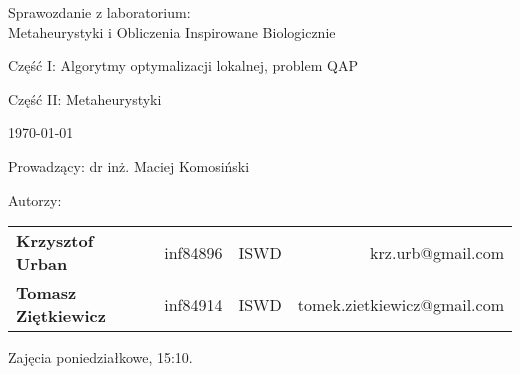 \thispagestyle{empty} %

\begin{center}
{\large{Sprawozdanie z laboratorium:\\
Metaheurystyki i Obliczenia Inspirowane Biologicznie}}

\vspace{3ex}

Część I: Algorytmy optymalizacji lokalnej, problem QAP

Część II: Metaheurystyki

\vspace{3ex}
{\footnotesize\today}

\end{center}

\vspace{10ex}

Prowadzący: dr inż. Maciej Komosiński

\vspace{5ex}

Autorzy:
\begin{tabular}{lllr}
\textbf{Krzysztof Urban} & inf84896 & ISWD & krz.urb@gmail.com \\
\textbf{Tomasz Ziętkiewicz} & inf84914 & ISWD & tomek.zietkiewicz@gmail.com \\
\end{tabular}

\vspace{5ex}

Zajęcia poniedziałkowe, 15:10.

\newpage

